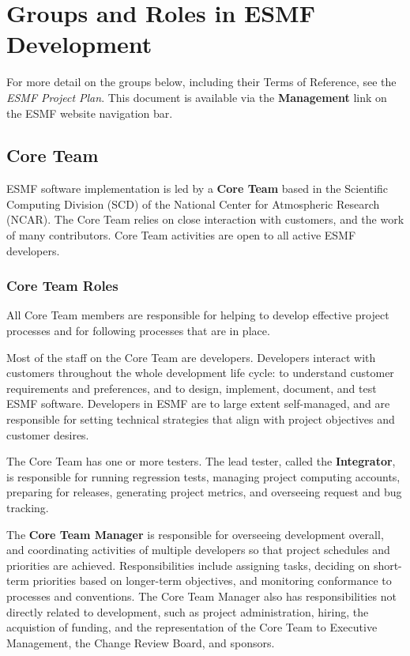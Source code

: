 
\section{Groups and Roles in ESMF Development}

For more detail on the groups below, including their Terms of
Reference, see the {\it ESMF Project Plan}\cite{bib:ESMFprojectplan}.
This document is available via the {\bf Management} link on 
the ESMF website navigation bar.

\subsection{Core Team}
ESMF software implementation is led by a {\bf Core Team} based in the 
Scientific Computing Division (SCD) of the National Center for
Atmospheric Research (NCAR).  The Core Team relies on close interaction
with customers, and the work of many contributors.  Core Team
activities are open to all active ESMF developers.

\subsubsection{Core Team Roles}
All Core Team members are responsible for helping to 
develop effective project processes and for following
processes that are in place.

Most of the staff on the Core Team are developers.  Developers
interact with customers throughout the whole development 
life cycle: to understand customer requirements and preferences,
and to design, implement, document, and test ESMF software.
Developers in ESMF are to large
extent self-managed, and are responsible for setting
technical strategies that align with project objectives
and customer desires.

The Core Team has one or more testers.  The lead tester, called
the {\bf Integrator}, is responsible for running regression
tests, managing project computing accounts, preparing for releases,
generating project metrics, and overseeing request and bug tracking.

The {\bf Core Team Manager} is responsible for overseeing development
overall, and coordinating activities of multiple developers
so that project schedules and priorities are achieved.
Responsibilities include assigning tasks, deciding on
short-term priorities based on longer-term objectives, 
and monitoring conformance to processes and conventions.
The Core Team Manager also has responsibilities not directly
related to development, such as project administration,
hiring, the acquistion of funding, and the representation of 
the Core Team to Executive Management, the Change Review 
Board, and sponsors.

